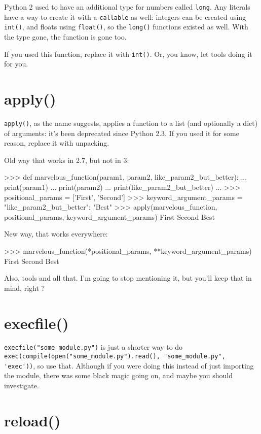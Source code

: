 Python 2 used to have an additional type for numbers called \lstinline{long}. Any \glspl{literal} have a way to create it with a \lstinline{callable} as well: integers can be created using \lstinline{int()}, and floats using \lstinline{float()}, so the \lstinline{long()} functions existed as well. With the type gone, the function is gone too.

If you used this function, replace it with \lstinline{int()}. Or, you know, let tools doing it for you.

\section{apply()}

\lstinline{apply()}, as the name suggests, applies a function to a list (and optionally a dict) of arguments: it's been deprecated since Python 2.3. If you used it for some reason, replace it with unpacking.

Old way that works in 2.7, but not in 3:

\begin{py2}
>>> def marvelous_function(param1, param2, like_param2_but_better):
...    print(param1)
...    print(param2)
...    print(like_param2_but_better)
...
>>> positional_params = ['First', 'Second']
>>> keyword_argument_params = {"like_param2_but_better": "Best"}
>>> apply(marvelous_function, positional_params, keyword_argument_params)
First
Second
Best
\end{py2}

New way, that works everywhere:

\begin{py2and3}
>>> marvelous_function(*positional_params, **keyword_argument_params)
First
Second
Best
\end{py2and3}

Also, tools and all that. I'm going to stop mentioning it, but you'll keep that in mind, right ?

\section{execfile()}

\lstinline{execfile("some_module.py")} is just a shorter way to do \lstinline{exec(compile(open("some_module.py").read(), "some_module.py", 'exec'))}, so use that. Although if you were doing this instead of just importing the module, there was some black magic going on, and maybe you should investigate.


\section{reload()}

